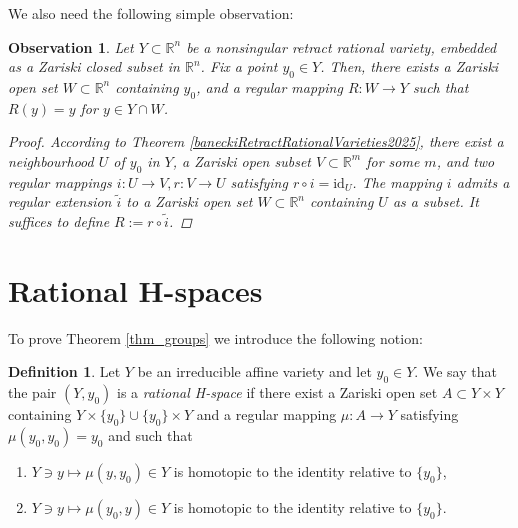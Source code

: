 \documentclass{article}
\theoremstyle{plain}
\newtheorem{obs}[thm]{Observation}
\theoremstyle{definition}
\newtheorem{defi}[thm]{Definition}
\theoremstyle{remark}
\newcommand{\R}{\mathbb{R}}
\newcommand{\id}{\mathrm{id}}
\begin{document}
We also need the following simple observation:
\begin{obs}\label{embedding_lem}
Let $Y\subset \R^n$ be a nonsingular retract rational variety, embedded as a Zariski closed subset in $\R^n$. Fix a point $y_0\in Y$. Then, there exists a Zariski open set $W\subset \R^n$ containing $y_0$, and a regular mapping $R:W\rightarrow Y$ such that $R(y)=y$ for $y\in Y\cap W$.
\begin{proof}
According to Theorem \ref{baneckiRetractRationalVarieties2025}, there exist a neighbourhood $U$ of $y_0$ in $Y$, a Zariski open subset $V\subset \R^m$ for some $m$, and two regular mappings $i:U\rightarrow V,r:V\rightarrow U$ satisfying $r\circ i=\id_U$. The mapping $i$ admits a regular extension $\widetilde{i}$ to a Zariski open set $W\subset \R^n$ containing $U$ as a subset. It suffices to define $R:=r\circ \widetilde{i}$.
\end{proof}
\end{obs}

\section{Rational H-spaces}
To prove Theorem \ref{thm_groups} we introduce the following notion:


\begin{defi}
Let $Y$ be an irreducible affine variety and let $y_0\in Y$. We say that the pair $(Y,y_0)$ is a \emph{rational H-space} if there exist a Zariski open set $A\subset Y\times Y$ containing $Y\times\{y_0\}\cup\{y_0\}\times Y$ and a regular mapping $\mu:A\rightarrow Y$ satisfying $\mu(y_0,y_0)=y_0$ and such that
\begin{enumerate}
    \item $Y\ni y\mapsto\mu(y,y_0)\in Y$ is homotopic to the identity relative to $\{y_0\}$, 
    \item $Y\ni y\mapsto\mu(y_0,y)\in Y$ is homotopic to the identity relative to $\{y_0\}$.
\end{enumerate}
\end{defi}
\end{document}
